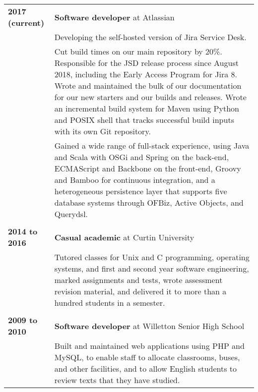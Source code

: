 \documentclass[a4paper,12pt]{article}
\begin{document}
\begin{tabular}{p{35mm}p{125mm}}
	                    \textbf{2017 (current)}     & \textbf{Software developer} at Atlassian
	\vspace{0.2em}  \\                              & Developing the self-hosted version of Jira Service Desk.
	\vspace{0.2em}  \\                              & Cut build times on our main repository by 20\%. Responsible for the JSD release process since August 2018, including the Early Access Program for Jira 8. Wrote and maintained the bulk of our documentation for our new starters and our builds and releases. Wrote an incremental build system for Maven using Python and POSIX shell that tracks successful build inputs with its own Git repository.
	\vspace{0.2em}  \\                              & Gained a wide range of full-stack experience, using Java and Scala with OSGi and Spring on the back-end, ECMAScript and Backbone on the front-end, Groovy and Bamboo for continuous integration, and a heterogeneous persistence layer that supports five database systems through OFBiz, Active Objects, and Querydsl.
	\\              \\  \textbf{2014 to 2016}       & \textbf{Casual academic} at Curtin University
	\vspace{0.2em}  \\                              & Tutored classes for Unix and C programming, operating systems, and first and second year software engineering, marked assignments and tests, wrote assessment revision material, and delivered it to more than a hundred students in a semester.
	\\              \\  \textbf{2009 to 2010}       & \textbf{Software developer} at Willetton Senior High School
	\vspace{0.2em}  \\                              & Built and maintained web applications using PHP and MySQL, to enable staff to allocate classrooms, buses, and other facilities, and to allow English students to review texts that they have studied.
\end{tabular}

\end{document}
